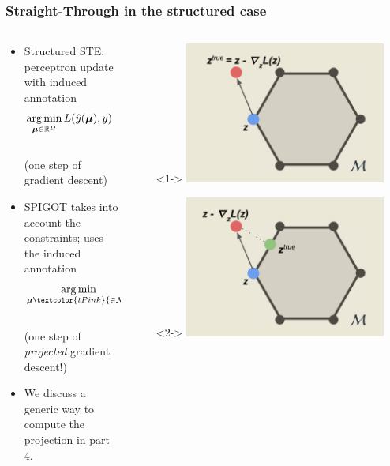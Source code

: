 \begin{frame}%
\frametitle{Straight-Through in the structured case}%
\begin{columns}[t]
\begin{column}{.65\textwidth}
\begin{itemize}
\small
\item<1-> Structured STE: perceptron update with induced annotation
\small
$$\operatorname*{arg\,min}_{\boldsymbol{\mu} \in \mathbb{R}^D}
L(\hat{y}(\boldsymbol{\mu}), y)
\quad\quad
\approx \boldsymbol{z} - \nabla_{\boldsymbol{z}} L(\boldsymbol{z})
\rightarrow \boldsymbol{z}^\text{true}
$$ \\
{\small (one step of gradient descent)}
\item<2-> SPIGOT takes into account the constraints; uses the induced annotation
$$\argmin_{\mg \textcolor{tPink}{\in
\mathcal{M}}}
L(\hat{y}(\mg), y)
\quad
\approx \operatorname{Proj}_\mathcal{M} \big(\z -
\nabla_{\z} L(\z) \big)
\rightarrow \z^\text{true}
$$ \\
{\small (one step of \emph{projected} gradient descent!)}
\item<3-> We discuss a generic way to compute the projection in part 4.
\end{itemize}
\end{column}
\begin{column}[T]{.35\textwidth}
\begin{itemize}
    \item[]<1-> \includegraphics[width=0.8\textwidth]{img/300_spigot_ste.pdf}
    \item[]<2-> \includegraphics[width=0.8\textwidth]{img/300_spigot_update.pdf}
\end{itemize}
\end{column}
\end{columns}
\end{frame}


